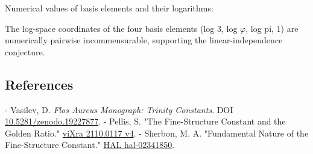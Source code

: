   Numerical values of basis elements and their logarithms:

  The log-space coordinates of the four basis elements (log 3, log $\varphi$, log pi, 1) are
  numerically pairwise incommensurable, supporting the linear-independence conjecture.

\subsection{References}

- Vasilev, D. \textit{Flos Aureus Monograph: Trinity Constants}. DOI \href{https://zenodo.org/doi/10.5281/zenodo.19227877}{10.5281/zenodo.19227877}.
- Pellis, S. "The Fine-Structure Constant and the Golden Ratio." \href{https://vixra.org/pdf/2110.0117v4.pdf}{viXra 2110.0117 v4}.
- Sherbon, M. A. "Fundamental Nature of the Fine-Structure Constant." \href{https://hal.science/hal-02341850/document}{HAL hal-02341850}.

